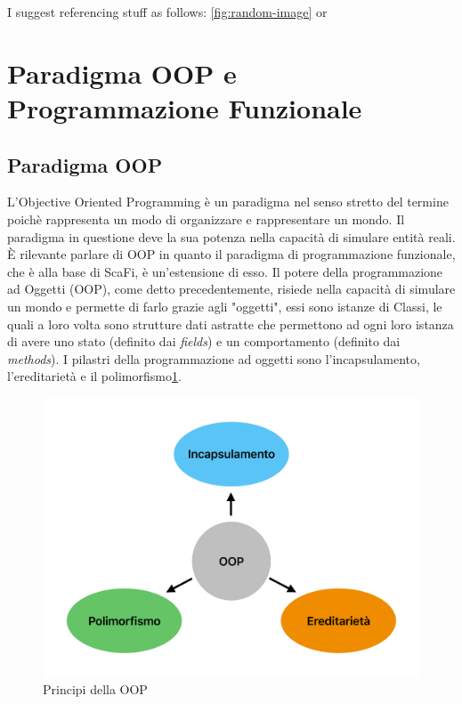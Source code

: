 \documentclass[12pt,a4paper,openright,twoside]{book}
\begin{document}
I suggest referencing stuff as follows: \cref{fig:random-image} or 


\section{Paradigma OOP e Programmazione Funzionale}

\subsection{Paradigma OOP}

L'Objective Oriented Programming è un paradigma nel senso stretto del termine poichè rappresenta un modo di organizzare e rappresentare un mondo. Il paradigma in questione deve la sua potenza nella capacità di simulare entità reali. 
È rilevante parlare di OOP in quanto il paradigma di programmazione funzionale, che è alla base di ScaFi, è un'estensione di esso. 
Il potere della programmazione ad Oggetti (OOP), come detto precedentemente, risiede nella capacità di simulare un mondo e permette di farlo grazie agli "oggetti", essi sono istanze di Classi, le quali a loro volta sono strutture dati astratte che permettono ad ogni loro istanza di avere uno stato (definito dai \textit{fields}) e un comportamento (definito dai \textit{methods}).
I pilastri della programmazione ad oggetti sono l'incapsulamento, l'ereditarietà e il polimorfismo\cref{fig:OOP}.

\begin{figure}
    \centering
    \includegraphics[width=.6\linewidth]{figures/OOP.pdf}
    \caption{Principi della OOP}
    \label{fig:OOP}
\end{figure}
\end{document}
